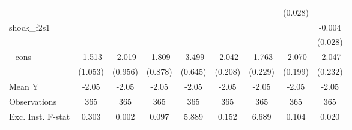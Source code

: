 {\begin{tabular}{l*{8}{c}}
            &                     &                     &                     &                     &                     &                     &     (0.028)         &                     \\
\addlinespace
shock\_f2s1  &                     &                     &                     &                     &                     &                     &                     &      -0.004         \\
            &                     &                     &                     &                     &                     &                     &                     &     (0.028)         \\
\addlinespace
\_cons      &      -1.513         &      -2.019\sym{**} &      -1.809\sym{**} &      -3.499\sym{***}&      -2.042\sym{***}&      -1.763\sym{***}&      -2.070\sym{***}&      -2.047\sym{***}\\
            &     (1.053)         &     (0.956)         &     (0.878)         &     (0.645)         &     (0.208)         &     (0.229)         &     (0.199)         &     (0.232)         \\
\midrule
Mean Y      &       -2.05         &       -2.05         &       -2.05         &       -2.05         &       -2.05         &       -2.05         &       -2.05         &       -2.05         \\
Observations&         365         &         365         &         365         &         365         &         365         &         365         &         365         &         365         \\
Exc. Inst. F-stat&       0.303         &       0.002         &       0.097         &       5.889         &       0.152         &       6.689         &       0.104         &       0.020         \\
\bottomrule
\end{tabular}
}
